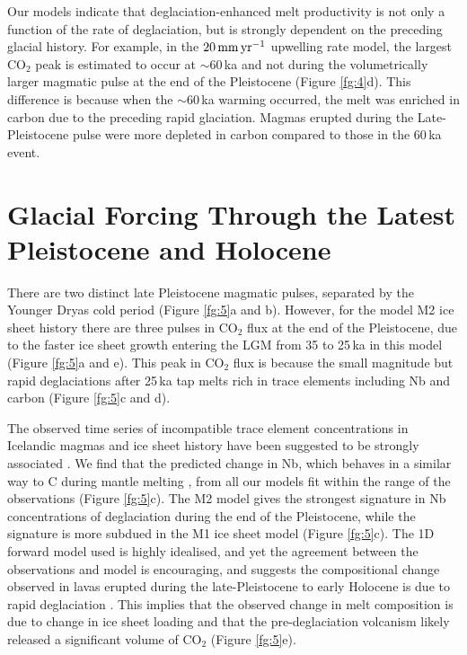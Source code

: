 \documentclass[draft,linenumbers]{agujournal2018}
\begin{document}
Our models indicate that deglaciation-enhanced melt productivity is not only a function of the rate of deglaciation, but is strongly dependent on the preceding glacial history. For example, in the $20\rm\,mm\,yr^{-1}$ upwelling rate model, the largest CO$_{2}$ peak is estimated to occur at $\sim$60\,ka and not during the volumetrically larger magmatic pulse at the end of the Pleistocene (Figure \ref{fg:4}d). This difference is because when the $\sim$60\,ka warming occurred, the melt was enriched in carbon due to the preceding rapid glaciation. Magmas erupted during the Late-Pleistocene pulse were more depleted in carbon compared to those in the 60\,ka event.

\section{Glacial Forcing Through the Latest Pleistocene and Holocene}

There are two distinct late Pleistocene magmatic pulses, separated by the Younger Dryas cold period (Figure \ref{fg:5}a and b). However, for the model M2 ice sheet history there are three pulses in CO$_{2}$ flux at the end of the Pleistocene, due to the faster ice sheet growth entering the LGM from 35 to 25\,ka in this model (Figure \ref{fg:5}a and e). This peak in CO$_{2}$ flux is because the small magnitude but rapid deglaciations after 25\,ka tap melts rich in trace elements including Nb and carbon (Figure \ref{fg:5}c and d).

The observed time series of incompatible trace element concentrations in Icelandic magmas and ice sheet history have been suggested to be strongly associated \citep{jull-1996,gee-etal-1998,maclennan-etal-2002,sinton-etal-2005,eason-etal-2015}. We find that the predicted change in Nb, which behaves in a similar way to C during mantle melting \citep{rosenthal-etal-2015}, from all our models fit within the range of the observations (Figure \ref{fg:5}c). The M2 model gives the strongest signature in Nb concentrations of deglaciation during the end of the Pleistocene, while the signature is more subdued in the M1 ice sheet model (Figure \ref{fg:5}c). The 1D forward model used is highly idealised, and yet the agreement between the observations and model is encouraging, and suggests the compositional change observed in lavas erupted during the late-Pleistocene to early Holocene is due to rapid deglaciation \citep{maclennan-etal-2002,sinton-etal-2005,gee-etal-1998,eason-etal-2015}. This implies that the observed change in melt composition is due to change in ice sheet loading and that the pre-deglaciation volcanism likely released a significant volume of CO$_{2}$ (Figure \ref{fg:5}e).
\end{document}
